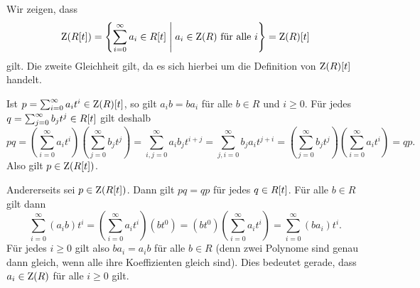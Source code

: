 \subsection{}

Wir zeigen, dass
\[
    \operatorname{Z}( R[t] )
  = \left\{
      \sum_{i=0}^\infty a_i \in R[t]
    \;\middle|\;
      \text{$a_i \in \operatorname{Z}(R)$ für alle $i$}
    \right\}
  = \operatorname{Z}(R) [t]
\]
gilt.
Die zweite Gleichheit gilt, da es sich hierbei um die Definition von $\operatorname{Z}(R) [t]$ handelt.

Ist $p = \sum_{i=0}^\infty a_i t^i \in \operatorname{Z}(R) [t]$, so gilt $a_i b = b a_i$ für alle $b \in R$ und $i \geq 0$.
Für jedes $q = \sum_{j=0}^\infty b_j t^j \in R[t]$ gilt deshalb
\[
     p q 
   = \left( \sum_{i=0}^\infty a_i t^i \right) \left( \sum_{j=0}^\infty b_j t^j \right)
   = \sum_{i,j=0}^\infty a_i b_j t^{i+j}
   = \sum_{j,i=0}^\infty b_j a_i t^{j+i}
   = \left( \sum_{j=0}^\infty b_j t^j \right) \left( \sum_{i=0}^\infty a_i t^i \right)
   = q p.
\]
Also gilt $p \in \operatorname{Z}( R[t] )$.

Andererseits sei $p \in \operatorname{Z}( R[t] )$.
Dann gilt $p q = q p$ für jedes $q \in R[t]$.
Für alle $b \in R$ gilt dann
\[
    \sum_{i=0}^\infty (a_i b) t^i
  = \left( \sum_{i=0}^\infty a_i t^i \right) \left( b t^0 \right)
  = \left( b t^0 \right) \left( \sum_{i=0}^\infty a_i t^i \right)
  = \sum_{i=0}^\infty (b a_i) t^i.
\]
Für jedes $i \geq 0$ gilt also $b a_i = a_i b$ für alle $b \in R$ (denn zwei Polynome sind genau dann gleich, wenn alle ihre Koeffizienten gleich sind).
Dies bedeutet gerade, dass $a_i \in \operatorname{Z}(R)$ für alle $i \geq 0$ gilt.
